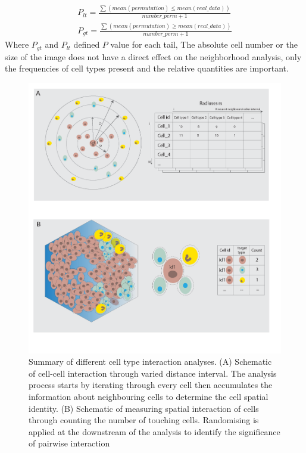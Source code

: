 \begin{equation}
\begin{split}
P_{lt} = \frac{ \sum(mean(permutation) \leq mean(real\_data) )}{number\_perm + 1} \\
P_{gt} = \frac{\sum(mean(permutation) \geq mean(real\_data) )}{number\_perm + 1}
\label{chap1:eq:02}
\end{split}
\end{equation}
Where $P_{gt}$ and $P_{lt}$ defined $P$ value for each tail, 
The absolute cell number or the size of the image does not have a direct effect on the neighborhood analysis, only the frequencies of cell types present and the relative quantities are important. 
\begin{figure}
    \centering
    \includegraphics[width=0.85\columnwidth]{Chapter3/Figures/Conceptualise_CCC_analysis_cropped-01.png}
    \caption{Summary of different cell type interaction analyses. (A) Schematic of cell-cell interaction through varied distance interval. The analysis process starts by iterating through every cell then accumulates the information about neighbouring cells to determine the cell spatial identity. (B) Schematic of measuring spatial interaction of cells through counting the number of touching cells. Randomising is applied at the downstream of the analysis to identify the significance of pairwise interaction}
    \label{fig:CCC_conceptualised}
\end{figure}

